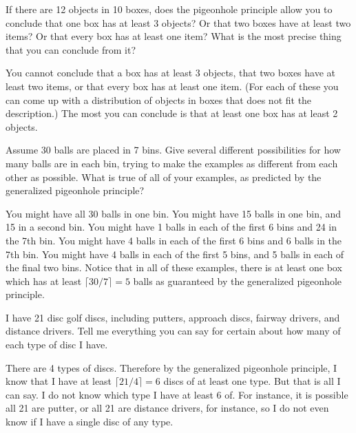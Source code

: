 \begin{requ}
If there are 12 objects in 10 boxes, does the pigeonhole principle allow you to conclude that
one box has at least 3 objects? Or that two boxes have at least two items? Or that every box has at least one item? 
What is the most precise thing that you can conclude from it?
\begin{requanswer}
You cannot conclude that a box has at least 3 objects, that two boxes have at least two items,
or that every box has at least one item. 
(For each of these you can come up with a distribution of objects in boxes that does not fit the description.)
The most you can conclude is that at least one box has at least 2 objects.
\end{requanswer}
\end{requ}

\begin{requ}
Assume 30 balls are placed in 7 bins. Give several different possibilities for how many balls are in each bin,
trying to make the examples as different from each other as possible. What is true of all of your examples,
as predicted by the generalized pigeonhole principle? 
\begin{requanswer}
You might have all 30 balls in one bin.
You might have 15 balls in one bin, and 15 in a second bin.
You might have 1 balls in each of the first 6 bins and 24 in the 7th bin.
You might have 4 balls in each of the first 6 bins and 6 balls in the 7th bin.
You might have 4 balls in each of the first 5 bins, and 5 balls in each of the final two bins.
Notice that in all of these examples, there is at least one box which has at least $\lceil 30/7\rceil =  5$ balls
as guaranteed by the generalized pigeonhole principle.
\end{requanswer}
\end{requ}

\begin{requ}
I have 21 disc golf discs, including putters, approach discs, fairway drivers, and distance drivers.
Tell me everything you can say for certain about how many of each type of disc I have.
\begin{requanswer}
There are 4 types of discs. Therefore by the generalized pigeonhole principle, I know that I have 
at least $\lceil 21/4\rceil =  6$ discs of at least one type. But that is all I can say. 
I do not know which type I have at least 6 of. For instance, it is possible all 21 are putter, or
all 21 are distance drivers, for instance, so I do not even know if I have a single disc of any type.
\end{requanswer}
\end{requ}

